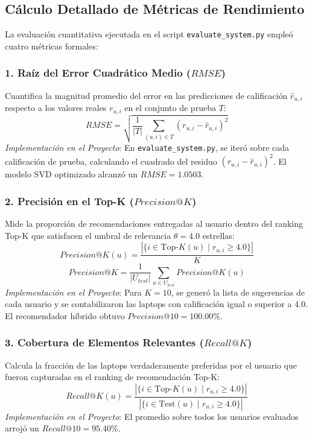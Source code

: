 \documentclass[12pt,a4paper]{article}
\begin{document}
\subsection{Cálculo Detallado de Métricas de Rendimiento}

La evaluación cuantitativa ejecutada en el script \texttt{evaluate\_system.py} empleó cuatro métricas formales:

\subsubsection{1. Raíz del Error Cuadrático Medio ($RMSE$)}
Cuantifica la magnitud promedio del error en las predicciones de calificación $\hat{r}_{u,i}$ respecto a los valores reales $r_{u,i}$ en el conjunto de prueba $T$:
\begin{equation}
RMSE = \sqrt{\frac{1}{|T|} \sum_{(u,i) \in T} (r_{u,i} - \hat{r}_{u,i})^2}
\end{equation}
\textit{Implementación en el Proyecto}: En \texttt{evaluate\_system.py}, se iteró sobre cada calificación de prueba, calculando el cuadrado del residuo $(r_{u,i} - \hat{r}_{u,i})^2$. El modelo SVD optimizado alcanzó un \textbf{$RMSE = 1.0503$}.

\subsubsection{2. Precisión en el Top-K ($Precision@K$)}
Mide la proporción de recomendaciones entregadas al usuario dentro del ranking Top-K que satisfacen el umbral de relevancia $\theta = 4.0$ estrellas:
\begin{equation}
Precision@K(u) = \frac{|\{i \in \text{Top-}K(u) \mid r_{u,i} \ge 4.0\}|}{K}
\end{equation}
\begin{equation}
Precision@K = \frac{1}{|U_{test}|} \sum_{u \in U_{test}} Precision@K(u)
\end{equation}
\textit{Implementación en el Proyecto}: Para $K=10$, se generó la lista de sugerencias de cada usuario y se contabilizaron las laptops con calificación igual o superior a 4.0. El recomendador híbrido obtuvo \textbf{$Precision@10 = 100.00\%$}.

\subsubsection{3. Cobertura de Elementos Relevantes ($Recall@K$)}
Calcula la fracción de las laptops verdaderamente preferidas por el usuario que fueron capturadas en el ranking de recomendación Top-K:
\begin{equation}
Recall@K(u) = \frac{|\{i \in \text{Top-}K(u) \mid r_{u,i} \ge 4.0\}|}{|\{i \in \text{Test}(u) \mid r_{u,i} \ge 4.0\}|}
\end{equation}
\textit{Implementación en el Proyecto}: El promedio sobre todos los usuarios evaluados arrojó un \textbf{$Recall@10 = 95.40\%$}.
\end{document}
